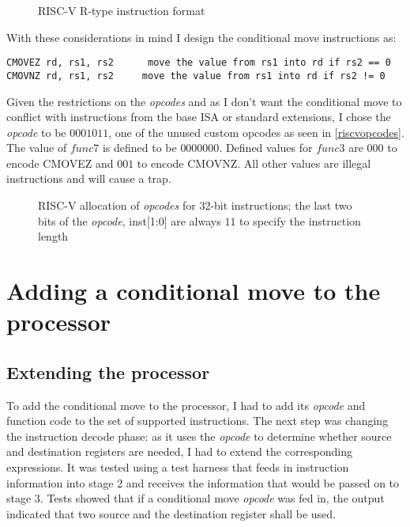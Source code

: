 \documentclass[12pt,twoside,notitlepage]{report}
\begin{document}
\begin{figure}[h]
\centering
\caption{RISC-V R-type instruction format}
\end{figure}

With these considerations in mind I design the conditional move instructions as:
\begin{verbatim}
CMOVEZ rd, rs1, rs2      move the value from rs1 into rd if rs2 == 0
CMOVNZ rd, rs1, rs2		move the value from rs1 into rd if rs2 != 0
\end{verbatim}

Given the restrictions on the \textit{opcodes} and as I don't want the conditional move to conflict with instructions from the base \gls{ISA} or standard extensions, I chose the \textit{opcode} to be $0001011$, one of the unused custom opcodes as seen in \ref{riscvopcodes}. The value of $func7$ is defined to be $0000000$. Defined values for $func3$ are $000$ to encode CMOVEZ and $001$ to encode CMOVNZ. All other values are illegal instructions and will cause a trap.

\begin{figure}[h]
\centering
\caption{RISC-V allocation of \textit{opcodes} for 32-bit instructions; the last two bits of the \textit{opcode}, inst[1:0] are always $11$ to specify the instruction length}
\end{figure}

\section{Adding a conditional move to the processor}

\subsection{Extending the processor}

To add the conditional move to the processor, I had to add its \textit{opcode} and function code to the set of supported instructions. The next step was changing the instruction decode phase: as it uses the \textit{opcode} to determine whether source and destination registers are needed, I had to extend the corresponding expressions. It was tested using a test harness that feeds in instruction information into stage 2 and receives the information that would be passed on to stage 3. Tests showed that if a conditional move \textit{opcode} was fed in, the output indicated that two source and the destination register shall be used.
\end{document}
